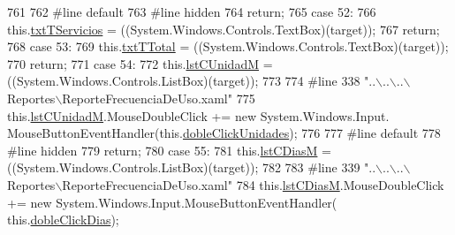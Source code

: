 \begin{DoxyCode}
761             
762 \textcolor{preprocessor}{            #line default}
763 \textcolor{preprocessor}{}\textcolor{preprocessor}{            #line hidden}
764 \textcolor{preprocessor}{}            \textcolor{keywordflow}{return};
765             \textcolor{keywordflow}{case} 52:
766             this.\hyperlink{class_proyecto___integrador__3_1_1_reportes_1_1_reporte_frecuencia_de_uso_a64a10f33c6df7de8fee16db2bccdfdeb}{txtTServicios} = ((System.Windows.Controls.TextBox)(target));
767             \textcolor{keywordflow}{return};
768             \textcolor{keywordflow}{case} 53:
769             this.\hyperlink{class_proyecto___integrador__3_1_1_reportes_1_1_reporte_frecuencia_de_uso_a220671fb7be4b6c864281288bce5fc86}{txtTTotal} = ((System.Windows.Controls.TextBox)(target));
770             \textcolor{keywordflow}{return};
771             \textcolor{keywordflow}{case} 54:
772             this.\hyperlink{class_proyecto___integrador__3_1_1_reportes_1_1_reporte_frecuencia_de_uso_ab371c0b71730bbb785efdca10a7d2d41}{lstCUnidadM} = ((System.Windows.Controls.ListBox)(target));
773             
774 \textcolor{preprocessor}{            #line 338 "..\(\backslash\)..\(\backslash\)..\(\backslash\)Reportes\(\backslash\)ReporteFrecuenciaDeUso.xaml"}
775 \textcolor{preprocessor}{}            this.\hyperlink{class_proyecto___integrador__3_1_1_reportes_1_1_reporte_frecuencia_de_uso_ab371c0b71730bbb785efdca10a7d2d41}{lstCUnidadM}.MouseDoubleClick += \textcolor{keyword}{new} System.Windows.Input.
      MouseButtonEventHandler(this.\hyperlink{class_proyecto___integrador__3_1_1_reportes_1_1_reporte_frecuencia_de_uso_a85f2c2307781a5f965e7785e2ad097c9}{dobleClickUnidades});
776             
777 \textcolor{preprocessor}{            #line default}
778 \textcolor{preprocessor}{}\textcolor{preprocessor}{            #line hidden}
779 \textcolor{preprocessor}{}            \textcolor{keywordflow}{return};
780             \textcolor{keywordflow}{case} 55:
781             this.\hyperlink{class_proyecto___integrador__3_1_1_reportes_1_1_reporte_frecuencia_de_uso_a8ce6aa1fd7ce5c054b011ee702ee1d03}{lstCDiasM} = ((System.Windows.Controls.ListBox)(target));
782             
783 \textcolor{preprocessor}{            #line 339 "..\(\backslash\)..\(\backslash\)..\(\backslash\)Reportes\(\backslash\)ReporteFrecuenciaDeUso.xaml"}
784 \textcolor{preprocessor}{}            this.\hyperlink{class_proyecto___integrador__3_1_1_reportes_1_1_reporte_frecuencia_de_uso_a8ce6aa1fd7ce5c054b011ee702ee1d03}{lstCDiasM}.MouseDoubleClick += \textcolor{keyword}{new} System.Windows.Input.MouseButtonEventHandler(
      this.\hyperlink{class_proyecto___integrador__3_1_1_reportes_1_1_reporte_frecuencia_de_uso_a2ab966196c9bc681df237775e5084d8d}{dobleClickDias});

\end{DoxyCode}
